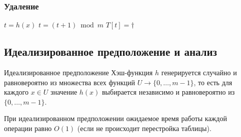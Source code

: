 \subsubsection*{Удаление}

\begin{algorithmic}[1]
	\State $t = h(x)$
	\State $t = (t + 1) \bmod m$
	\EndWhile
	\State $T[t] = \dagger$
	\EndIf
\end{algorithmic}

\subsection{Идеализированное предположение и анализ}

\begin{Definition}{Идеализированное предположение}{}
	Хэш-функция $h$ генерируется случайно и равновероятно из множества всех функций $U \to \{0, \ldots, m-1\}$, то есть для каждого $x \in U$ значение $h(x)$ выбирается независимо и равновероятно из $\{0, \ldots, m-1\}$.
\end{Definition}

\begin{Theorem}{}{}
	При идеализированном предположении ожидаемое время работы каждой операции равно $O(1)$ (если не происходит перестройка таблицы).
\end{Theorem}

